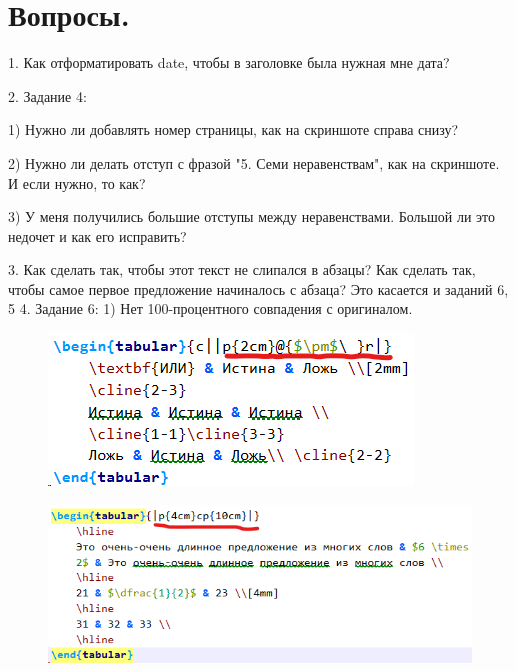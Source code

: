 \documentclass[a4paper,12pt]{article} %
\begin{document}
	\newpage
	\section{Вопросы.}
	1. Как отформатировать date, чтобы в заголовке была нужная мне дата?
	
	2. Задание 4:

		1) Нужно ли добавлять номер страницы, как на скриншоте справа снизу?
		
		2) Нужно ли делать отступ с фразой "5. Семи неравенствам", как на скриншоте. И если нужно, то как?
		
		3) У меня получились большие отступы между неравенствами. Большой ли это недочет и как его исправить?
		
	3. Как сделать так, чтобы этот текст не слипался в абзацы? Как сделать так, чтобы самое первое предложение начиналось с абзаца? Это касается и заданий 6, 5
	4. Задание 6:
		1) Нет 100-процентного совпадения с оригиналом.
		\begin{figure}
			\centering
			\includegraphics[width=0.7\linewidth]{screenshot001}
			\caption{}
			\label{fig:screenshot001}
		\end{figure}
		\begin{figure}
			\centering
			\includegraphics[width=0.7\linewidth]{screenshot002}
			\caption{}
			\label{fig:screenshot002}
		\end{figure}
		
	
\end{document}
